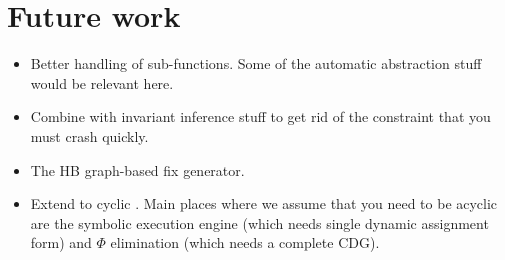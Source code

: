 \chapter{Future work}

\begin{itemize}
\item
  Better handling of sub-functions.  Some of the automatic abstraction
  stuff would be relevant here.
\item
  Combine with invariant inference stuff to get rid of the constraint
  that you must crash quickly.
\item
  The HB graph-based fix generator.
\item
  Extend to cyclic {\StateMachines}.  Main places where we assume that
  you need to be acyclic are the symbolic execution engine (which
  needs single dynamic assignment form) and $\Phi$ elimination (which
  needs a complete CDG).
\end{itemize}
